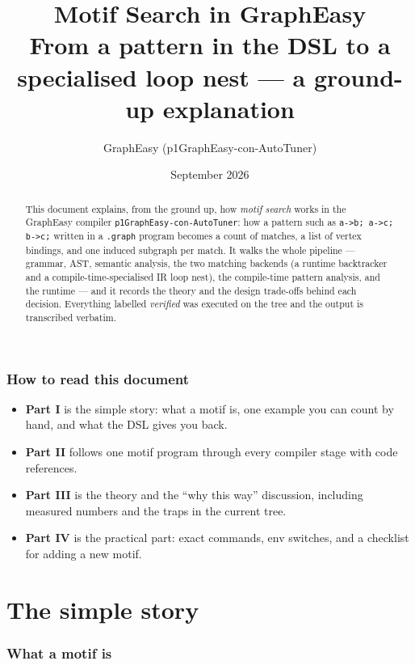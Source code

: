\documentclass[11pt,a4paper]{article}
\title{\bfseries Motif Search in GraphEasy\\[2mm]
\large From a pattern in the DSL to a specialised loop nest --- a ground-up explanation}
\author{GraphEasy (p1GraphEasy-con-AutoTuner)}
\date{September 2026}
\newcommand{\code}[1]{\texttt{#1}}
\newcommand{\file}[1]{\texttt{#1}}
\begin{document}
\maketitle

\begin{abstract}
\noindent
This document explains, from the ground up, how \emph{motif search} works in the
GraphEasy compiler \file{p1GraphEasy-con-AutoTuner}: how a pattern such as
\code{a->b; a->c; b->c;} written in a \file{.graph} program becomes a count of
matches, a list of vertex bindings, and one induced subgraph per match. It walks
the whole pipeline --- grammar, AST, semantic analysis, the two matching backends
(a runtime backtracker and a compile-time-specialised IR loop nest), the
compile-time pattern analysis, and the runtime --- and it records the theory and
the design trade-offs behind each decision. Everything labelled
\emph{verified} was executed on the tree and the output is transcribed verbatim.
\end{abstract}

\tableofcontents

\section*{How to read this document}
\begin{itemize}
  \item \textbf{Part I} is the simple story: what a motif is, one example you can
        count by hand, and what the DSL gives you back.
  \item \textbf{Part II} follows one motif program through every compiler stage
        with code references.
  \item \textbf{Part III} is the theory and the ``why this way'' discussion,
        including measured numbers and the traps in the current tree.
  \item \textbf{Part IV} is the practical part: exact commands, env switches,
        and a checklist for adding a new motif.
\end{itemize}

\part{The simple story}

\section{What a motif is}
\end{document}
